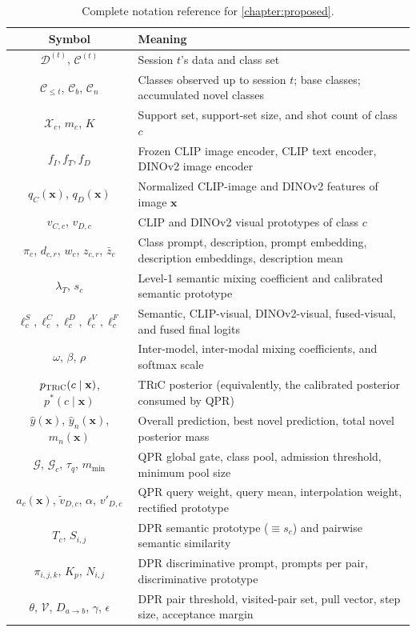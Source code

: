 \documentclass{iutbscthesis}
\begin{document}
\begin{appendices}
\begin{table}[H]
    \centering
    \small
    \begin{tabular}{c l}
        \toprule
        Symbol & Meaning \\
        \midrule
        $\mathcal{D}^{(t)}$, $\mathcal{C}^{(t)}$ & Session $t$'s data and class set \\
        $\mathcal{C}_{\le t}$, $\mathcal{C}_b$, $\mathcal{C}_n$ & Classes observed up to session $t$; base classes; accumulated novel classes \\
        $\mathcal{X}_c$, $m_c$, $K$ & Support set, support-set size, and shot count of class $c$ \\
        $f_I, f_T, f_D$ & Frozen CLIP image encoder, CLIP text encoder, DINOv2 image encoder \\
        $q_C(\mathbf{x})$, $q_D(\mathbf{x})$ & Normalized CLIP-image and DINOv2 features of image $\mathbf{x}$ \\
        $v_{C,c}$, $v_{D,c}$ & CLIP and DINOv2 visual prototypes of class $c$ \\
        $\pi_c$, $d_{c,r}$, $w_c$, $z_{c,r}$, $\bar z_c$ & Class prompt, description, prompt embedding, description embeddings, description mean \\
        $\lambda_T$, $s_c$ & Level-1 semantic mixing coefficient and calibrated semantic prototype \\
        $\ell^S_c, \ell^C_c, \ell^D_c, \ell^V_c, \ell^F_c$ & Semantic, CLIP-visual, DINOv2-visual, fused-visual, and fused final logits \\
        $\omega$, $\beta$, $\rho$ & Inter-model, inter-modal mixing coefficients, and softmax scale \\
        $p_{\textsc{TRiC}}(c\mid\mathbf{x})$, $p^*(c\mid\mathbf{x})$ & \textsc{TRiC} posterior (equivalently, the calibrated posterior consumed by QPR) \\
        $\hat y(\mathbf{x})$, $\hat y_n(\mathbf{x})$, $m_n(\mathbf{x})$ & Overall prediction, best novel prediction, total novel posterior mass \\
        $\mathcal{G}$, $\mathcal{G}_c$, $\tau_q$, $m_{\min}$ & QPR global gate, class pool, admission threshold, minimum pool size \\
        $a_c(\mathbf{x})$, $\tilde v_{D,c}$, $\alpha$, $v'_{D,c}$ & QPR query weight, query mean, interpolation weight, rectified prototype \\
        $T_c$, $S_{i,j}$ & DPR semantic prototype ($\equiv s_c$) and pairwise semantic similarity \\
        $\pi_{i,j,k}$, $K_p$, $N_{i,j}$ & DPR discriminative prompt, prompts per pair, discriminative prototype \\
        $\theta$, $\mathcal{V}$, $D_{a\to b}$, $\gamma$, $\epsilon$ & DPR pair threshold, visited-pair set, pull vector, step size, acceptance margin \\
        \bottomrule
    \end{tabular}
    \caption{Complete notation reference for \autoref{chapter:proposed}.}
    \label{tab:fullnotation}
\end{table}

\end{appendices}
\end{document}
